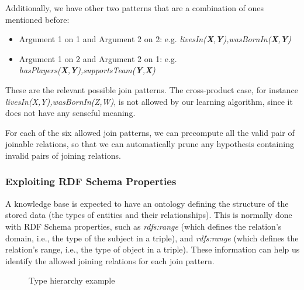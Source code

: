 Additionally, we have other two patterns that are a combination of ones mentioned before:

\begin{itemize}
 \item Argument 1 on 1 and Argument 2 on 2: e.g.
\emph{livesIn(\textbf{X},\textbf{Y}),wasBornIn(\textbf{X},\textbf{Y})}
 \item Argument 1 on 2 and Argument 2 on 1: e.g.
\emph{hasPlayers(\textbf{X},\textbf{Y}),supportsTeam(\textbf{Y},\textbf{X})}
\end{itemize}

These are the relevant possible join patterns. The cross-product case, for instance
\emph{livesIn(X,Y),wasBornIn(Z,W)}, is not allowed by our learning algorithm, since it does not have any senseful
meaning.

For each of the six allowed join patterns, we can precompute all the valid pair of joinable relations, so that
we can automatically prune any hypothesis containing invalid pairs of joining relations.

\subsubsection{Exploiting RDF Schema Properties}

A knowledge base is expected to have an ontology defining the structure of the stored data (the types of entities and
their relationships). This is normally done with RDF Schema properties, such as \emph{rdfs:range} (which
defines the relation's domain, i.e., the type of the subject in a triple), and \emph{rdfs:range} (which defines the
relation's range, i.e., the type of object in a triple). These information can help us identify the allowed joining
relations for each join pattern.

\begin{figure}[h!]
  \caption{Type hierarchy example}
  \centering
  \label{fig:hierarchy}
\end{figure}

